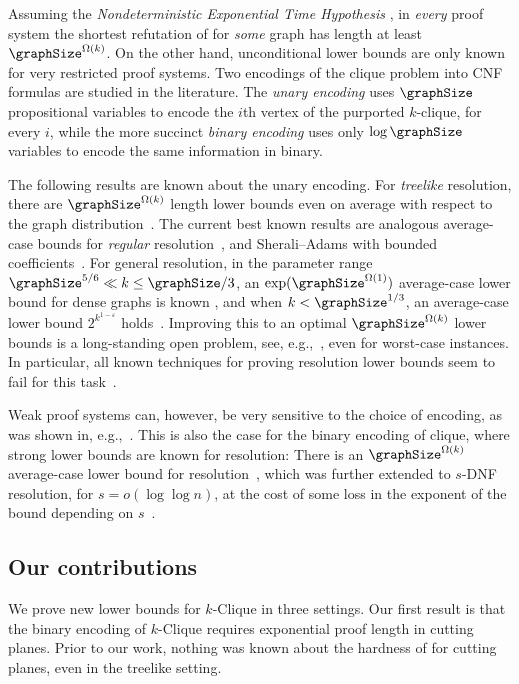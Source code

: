 Assuming the \emph{Nondeterministic Exponential Time Hypothesis} \cite{CIMPR16}, in \emph{every} proof system the shortest refutation of \kClique for \emph{some} graph has length at least $\graphSize^{\Omega(k)}$.
On the other hand, unconditional lower bounds are only known for very restricted proof systems. 
Two encodings of the clique problem into CNF formulas are studied in the literature.
The \emph{unary encoding} uses $\graphSize$ propositional variables to encode the $i$th vertex of the purported $k$-clique, for every $i$,
while the more succinct \emph{binary encoding} uses only $\log \graphSize$ variables to encode the same information in binary. 

The following results are known about the unary encoding. 
For \emph{treelike} resolution, there are $\graphSize^{\Omega(k)}$ length lower bounds even 
on average 
with respect to the \erdosrenyi graph distribution~\cite{BGL13ParameterizedDPLL,Lauria18Cliques}. 
The current best known results are analogous average-case bounds for \emph{regular} resolution~\cite{ABdRLNR21Clique}, and Sherali--Adams with bounded coefficients~\cite{dRPR23UnarySA}.
For general resolution, in the parameter range $\graphSize^{5/6}\ll k \leq \graphSize/3$, an $\exp (\graphSize^{\Omega(1)})$ average-case lower bound for dense graphs is known
\cite{BIS07IndependentSets}, and when $k<\graphSize^{1/3}$, an average-case lower bound $2^{k^{1-\varepsilon}}$ holds~\cite{Pang21}.
Improving this to an optimal $\graphSize^{\Omega(k)}$ lower bounds is a long-standing open problem, see, e.g.,~\cite{BGLR12Parametrized,BN21ProofCplxSAT}, even for worst-case instances. 
In particular, all known techniques for proving resolution lower bounds seem to fail for this task~\cite{ABdRLNR21Clique}.


Weak proof systems can, however, be very sensitive to the choice of encoding, as was shown in, e.g.,~\cite{DGGM24Binary}.
This is also the case for the binary encoding of clique, where strong lower bounds are known for resolution:
There is an $\graphSize^{\Omega(k)}$ average-case lower bound for resolution~\cite{LPRT17ComplexityRamsey}, which was further extended to $s$-DNF resolution, for $s=o(\log \log n)$, at the cost of some loss in the exponent of the bound depending on $s$~\cite{DGGM24Binary}.


\subsection{Our contributions} 

We prove new lower bounds for $k$-\textsf{Clique} in three settings. Our first result is that
the binary encoding of $k$-\textsf{Clique} requires exponential proof length in cutting planes.
Prior to our work, nothing was known about the hardness of \kClique for cutting planes, even in the treelike setting.

